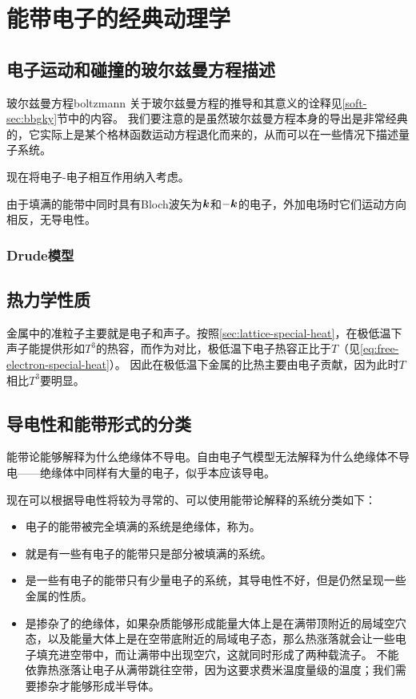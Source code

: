 \section{能带电子的经典动理学}

\subsection{电子运动和碰撞的玻尔兹曼方程描述}

\begin{back}{玻尔兹曼方程}{boltzmann}
    关于玻尔兹曼方程的推导和其意义的诠释见\ref{soft-sec:bbgky}节中的内容。
    我们要注意的是虽然玻尔兹曼方程本身的导出是非常经典的，它实际上是某个格林函数运动方程退化而来的，从而可以在一些情况下描述量子系统。
\end{back}

现在将电子-电子相互作用纳入考虑。

由于填满的能带中同时具有Bloch波矢为$\vb*{k}$和$-\vb*{k}$的电子，外加电场时它们运动方向相反，无导电性。

\subsubsection{Drude模型}

\subsection{热力学性质}


金属中的准粒子主要就是电子和声子。按照\autoref{sec:lattice-special-heat}，在极低温下声子能提供形如$T^3$的热容，而作为对比，极低温下电子热容正比于$T$（见\eqref{eq:free-electron-special-heat}）。
因此在极低温下金属的比热主要由电子贡献，因为此时$T$相比$T^3$要明显。

\subsection{导电性和能带形式的分类}\label{sec:conductor-classification}

能带论能够解释为什么绝缘体不导电。自由电子气模型无法解释为什么绝缘体不导电——绝缘体中同样有大量的电子，似乎本应该导电。


现在可以根据导电性将较为寻常的、可以使用能带论解释的系统分类如下：
\begin{itemize}
    \item 电子的能带被完全填满的系统是绝缘体，称为。
    \item {}就是有一些有电子的能带只是部分被填满的系统。
    \item {}是一些有电子的能带只有少量电子的系统，其导电性不好，但是仍然呈现一些金属的性质。
    \item {}是掺杂了的绝缘体，如果杂质能够形成能量大体上是在满带顶附近的局域空穴态，以及能量大体上是在空带底附近的局域电子态，那么热涨落就会让一些电子填充进空带中，而让满带中出现空穴，这就同时形成了两种载流子。
    不能依靠热涨落让电子从满带跳往空带，因为这要求费米温度量级的温度；我们需要掺杂才能够形成半导体。
\end{itemize}

